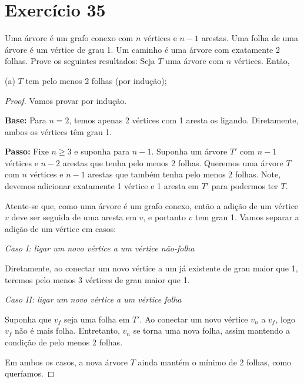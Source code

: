 \documentclass{article}
\newcommand{\base}{\textbf{Base: }}
\newcommand{\passo}{\textbf{Passo: }}
\begin{document}
\section*{Exercício 35}
Uma árvore é um grafo conexo com $n$ vértices e $n-1$ arestas.
Uma folha de uma árvore é um vértice de grau 1.
Um caminho é uma árvore com exatamente 2 folhas.
Prove os seguintes resultados:
Seja $T$ uma árvore com $n$ vértices. Então,

(a) $T$ tem pelo menos 2 folhas (por indução);
\begin{proof}
Vamos provar por indução.

\base Para $n=2$, temos apenas 2 vértices com 1 aresta os ligando.
Diretamente, ambos os vértices têm grau 1.

\passo Fixe $n \geq 3$ e suponha para $n-1$.
Suponha um árvore $T'$ com $n-1$ vértices e $n-2$ arestas que tenha pelo menos 2 folhas.
Queremos uma árvore $T$ com $n$ vértices e $n-1$ arestas que também tenha pelo menos 2 folhas.
Note, devemos adicionar exatamente 1 vértice e 1 aresta em $T'$ para podermos ter $T$.

Atente-se que, como uma árvore é um grafo conexo, então a adição de um vértice $v$ deve ser seguida de uma aresta em $v$, e portanto $v$ tem grau 1.
Vamos separar a adição de um vértice em casos:

\textit{Caso I: ligar um novo vértice a um vértice não-folha}

Diretamente, ao conectar um novo vértice a um já existente de grau maior que 1, teremos pelo menos 3 vértices de grau maior que 1.

\textit{Caso II: ligar um novo vértice a um vértice folha}

Suponha que $v_f$ seja uma folha em $T'$.
Ao conectar um novo vértice $v_n$ a $v_f$, logo $v_f$ não é mais folha.
Entretanto, $v_n$ se torna uma nova folha, assim mantendo a condição de pelo menos 2 folhas.

Em ambos os casos, a nova árvore $T$ ainda mantém o mínimo de 2 folhas, como queríamos.
\end{proof}
\end{document}
